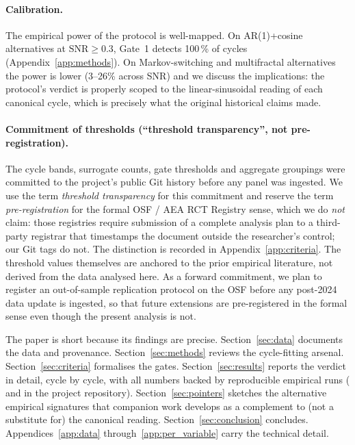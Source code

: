 \paragraph{Calibration.}
The empirical power of the protocol is well-mapped. On
AR(1)+cosine alternatives at \(\mathrm{SNR}\geq 0.3\), Gate~1
detects 100\,\% of cycles
(Appendix~\ref{app:methods}). On Markov-switching and
multifractal alternatives the power is lower (3--26\% across SNR)
and we discuss the implications: the protocol's verdict is
properly scoped to the linear-sinusoidal reading of each
canonical cycle, which is precisely what the original
historical claims made.

\paragraph{Commitment of thresholds (``threshold transparency'',
not pre-registration).}
The cycle bands, surrogate counts, gate thresholds and
aggregate groupings were committed to the project's public Git
history before any panel was ingested. We use the term
\emph{threshold transparency} for this commitment and reserve
the term \emph{pre-registration} for the formal OSF / AEA RCT
Registry sense, which we do \emph{not} claim: those registries
require submission of a complete analysis plan to a
third-party registrar that timestamps the document outside the
researcher's control; our Git tags do not. The distinction is
recorded in Appendix~\ref{app:criteria}. The threshold values
themselves are anchored to the prior empirical literature, not
derived from the data analysed here. As a forward commitment,
we plan to register an out-of-sample replication protocol on
the OSF before any post-2024 data update is ingested, so that
future extensions are pre-registered in the formal sense even
though the present analysis is not.

The paper is short because its findings are precise.
Section~\ref{sec:data} documents the data and provenance.
Section~\ref{sec:methods} reviews the cycle-fitting arsenal.
Section~\ref{sec:criteria} formalises the gates.
Section~\ref{sec:results} reports the verdict in detail,
cycle by cycle, with all numbers backed by reproducible
empirical runs ( and  in the
project repository). Section~\ref{sec:pointers} sketches the
alternative empirical signatures
that companion work develops as a complement to (not a
substitute for) the canonical reading.
Section~\ref{sec:conclusion} concludes.
Appendices~\ref{app:data} through~\ref{app:per_variable}
carry the technical detail.
